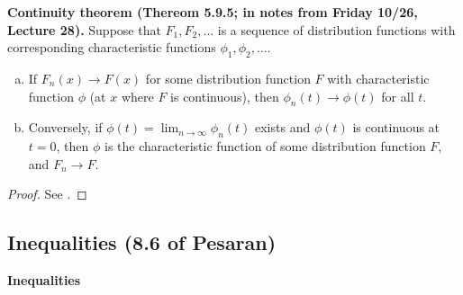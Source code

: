 \begin{theorem}\label{asym.contin.thm}
\textbf{Continuity theorem (Thereom 5.9.5; in notes from Friday 10/26, Lecture 28).} Suppose that \(F_1, F_2, \ldots\) is a sequence of distribution functions with corresponding characteristic functions \(\phi_1, \phi_2, \ldots\). 

\begin{enumerate}[(a)]

\item If \(F_n(x) \to F(x)\) for some distribution function \(F\) with characteristic function \(\phi\) (at \(x\) where \(F\) is continuous), then \(\phi_n(t) \to \phi(t)\) for all \(t\).

\item Conversely, if \(\phi(t) = \lim_{n \to \infty} \phi_n(t)\) exists and \(\phi(t)\) is continuous at \(t = 0\), then \(\phi\) is the characteristic function of some distribution function \(F\), and \(F_n \to F\). 

\end{enumerate}
\end{theorem}

\begin{proof} See \citet{kingman1966introduction}. \end{proof}


\subsection{Inequalities (8.6 of Pesaran)}
\label{sec:tsch8.6}

\textbf{Inequalities}

